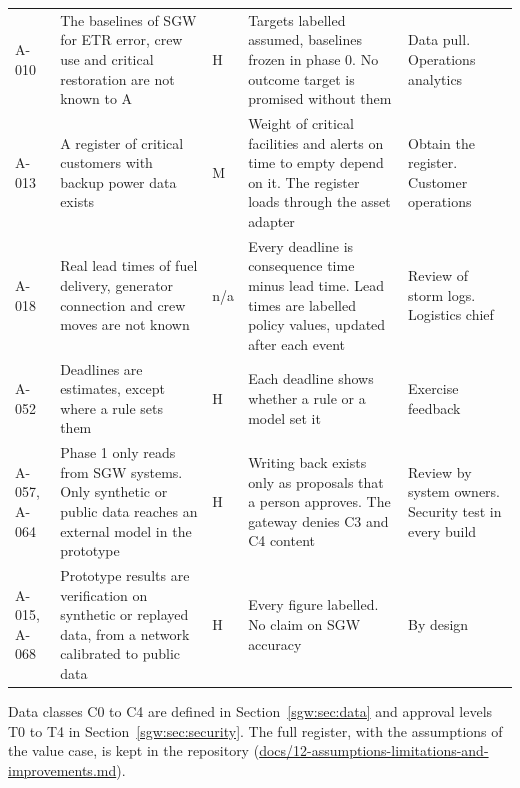 \documentclass[fontsize=10pt,a4paper,DIV=12,parskip=half-,numbers=noenddot,headsepline,captions=tableheading]{scrartcl}
\begin{document}
{\begin{xltabular}{\textwidth}{@{}L{1.05cm} L{4.6cm} L{0.55cm} Y L{3.0cm}@{}}
  A-010 & The baselines of SGW for ETR error, crew use and critical restoration are not known to A & H & Targets labelled assumed, baselines frozen in phase 0. No outcome target is promised without them & Data pull. Operations analytics \\ \lightrowrule
  A-013 & A register of critical customers with backup power data exists & M & Weight of critical facilities and alerts on time to empty depend on it. The register loads through the asset adapter & Obtain the register. Customer operations \\ \lightrowrule
  A-018 & Real lead times of fuel delivery, generator connection and crew moves are not known & n/a & Every deadline is consequence time minus lead time. Lead times are labelled policy values, updated after each event & Review of storm logs. Logistics chief \\ \lightrowrule
  A-052 & Deadlines are estimates, except where a rule sets them & H & Each deadline shows whether a rule or a model set it & Exercise feedback \\ \lightrowrule
  A-057, A-064 & Phase 1 only reads from SGW systems. Only synthetic or public data reaches an external model in the prototype & H & Writing back exists only as proposals that a person approves. The gateway denies C3 and C4 content & Review by system owners. Security test in every build \\ \lightrowrule
  A-015, A-068 & Prototype results are verification on synthetic or replayed data, from a network calibrated to public data & H & Every figure labelled. No claim on SGW accuracy & By design \\
\end{xltabular}}
Data classes C0 to C4 are defined in Section~\ref{sgw:sec:data} and approval levels T0 to T4 in Section~\ref{sgw:sec:security}. The full register, with the assumptions of the value case, is kept in the repository (\url{docs/12-assumptions-limitations-and-improvements.md}).
\end{document}
